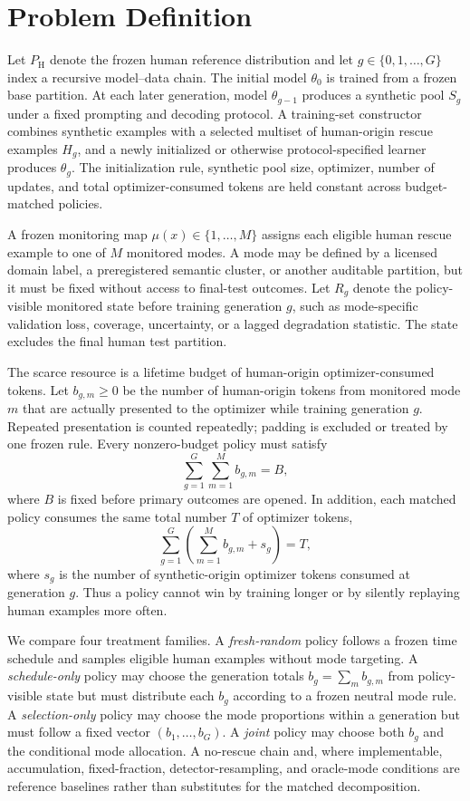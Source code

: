 \section{Problem Definition}

Let $P_{\mathrm{H}}$ denote the frozen human reference distribution and let $g\in\{0,1,\ldots,G\}$ index a recursive model--data chain. The initial model $\theta_0$ is trained from a frozen base partition. At each later generation, model $\theta_{g-1}$ produces a synthetic pool $S_g$ under a fixed prompting and decoding protocol. A training-set constructor combines synthetic examples with a selected multiset of human-origin rescue examples $H_g$, and a newly initialized or otherwise protocol-specified learner produces $\theta_g$. The initialization rule, synthetic pool size, optimizer, number of updates, and total optimizer-consumed tokens are held constant across budget-matched policies.

A frozen monitoring map $\mu(x)\in\{1,\ldots,M\}$ assigns each eligible human rescue example to one of $M$ monitored modes. A mode may be defined by a licensed domain label, a preregistered semantic cluster, or another auditable partition, but it must be fixed without access to final-test outcomes. Let $R_g$ denote the policy-visible monitored state before training generation $g$, such as mode-specific validation loss, coverage, uncertainty, or a lagged degradation statistic. The state excludes the final human test partition.

The scarce resource is a lifetime budget of human-origin optimizer-consumed tokens. Let $b_{g,m}\geq 0$ be the number of human-origin tokens from monitored mode $m$ that are actually presented to the optimizer while training generation $g$. Repeated presentation is counted repeatedly; padding is excluded or treated by one frozen rule. Every nonzero-budget policy must satisfy
\[
\sum_{g=1}^{G}\sum_{m=1}^{M} b_{g,m}=B,
\]
where $B$ is fixed before primary outcomes are opened. In addition, each matched policy consumes the same total number $T$ of optimizer tokens,
\[
\sum_{g=1}^{G}\left(\sum_{m=1}^{M}b_{g,m}+s_g\right)=T,
\]
where $s_g$ is the number of synthetic-origin optimizer tokens consumed at generation $g$. Thus a policy cannot win by training longer or by silently replaying human examples more often.

We compare four treatment families. A \emph{fresh-random} policy follows a frozen time schedule and samples eligible human examples without mode targeting. A \emph{schedule-only} policy may choose the generation totals $b_g=\sum_m b_{g,m}$ from policy-visible state but must distribute each $b_g$ according to a frozen neutral mode rule. A \emph{selection-only} policy may choose the mode proportions within a generation but must follow a fixed vector $(b_1,\ldots,b_G)$. A \emph{joint} policy may choose both $b_g$ and the conditional mode allocation. A no-rescue chain and, where implementable, accumulation, fixed-fraction, detector-resampling, and oracle-mode conditions are reference baselines rather than substitutes for the matched decomposition.

